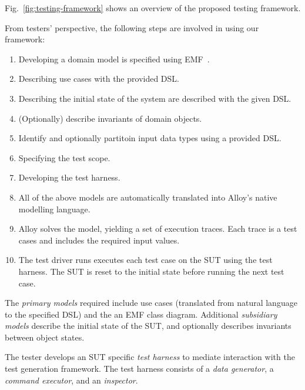 %
%
\label{sec:framework-overview}
Fig.~\ref{fig:testing-framework} shows an overview of the proposed testing framework.

From testers' perspective, the following steps are involved in using our framework:
\begin{enumerate}
	\item Developing a domain model is specified using EMF~\cite{EMF}. 
	
	\item Describing use cases with the provided DSL.
	
	\item Describing the initial state of the system are described with the given DSL.
	
	\item (Optionally) describe invariants of domain objects.
	
	\item Identify and optionally partitoin input data types using a provided DSL. 
	
	\item Specifying the test scope.
	
	\item Developing the test harness.
	
	\item All of the above models are automatically translated into Alloy's native modelling language.
	
	\item Alloy solves the model, yielding a set of execution traces. Each trace is a test cases and includes the required input values.
	
	\item The test driver runs executes each test case on the SUT using the test harness. The SUT is reset to the initial state
	before running the next test case.
\end{enumerate}


The \textit{primary models} required include use cases (translated from natural language to the specified DSL) and
the an EMF class diagram.
Additional \textit{subsidiary models} describe the initial state of the SUT, and optionally describes
invariants between object states.

The tester develops an SUT specific \textit{test harness} to mediate interaction with the test generation framework. The test harness consists of a \textit{data generator}, a \textit{command executor}, and an \textit{inspector}. 

